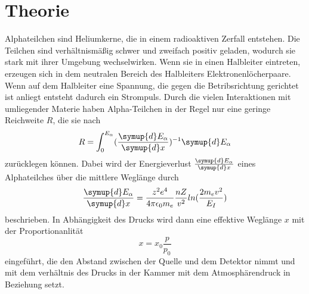 \section{Theorie}
\label{sec:Theorie}

Alphateilchen sind Heliumkerne, die in einem radioaktiven Zerfall entstehen. Die Teilchen sind verhältnismäßig
schwer und zweifach positiv geladen, wodurch sie stark mit ihrer Umgebung wechselwirken. Wenn sie in einen
Halbleiter eintreten, erzeugen sich in dem neutralen Bereich des Halbleiters Elektronenlöcherpaare. Wenn auf dem Halbleiter eine Spannung, die gegen die Betribsrichtung gerichtet ist anliegt
entsteht dadurch ein Strompuls. Durch die vielen Interaktionen mit umliegender Materie haben Alpha-Teilchen in der Regel
nur eine geringe Reichweite $R$, die sie nach
\begin{equation}
    R=\int_0^{E_\alpha}(\frac{\symup{d}E_\alpha}{\symup{d}x})^{-1}\symup{d}E_\alpha  
    \label{eqn:Weglänge}
\end{equation}
\noindent zurücklegen können. Dabei wird der Energieverlust $\frac{\symup{d}E_\alpha}{\symup{d}x}$ eines Alphateilches
über die mittlere Weglänge durch
\begin{equation}
    \frac{\symup{d}E_\alpha}{\symup{d}x}=\frac{z^2 e^4}{4\pi \epsilon_0 m_e}\frac{nZ}{v^2}ln(\frac{2m_ev^2}{E_I})
    \label{eqn:bethe}
\end{equation}
\noindent beschrieben.
In Abhängigkeit des Drucks wird dann eine effektive Weglänge $x$ mit der Proportionanlität
\begin{equation}
    x=x_0\frac{p}{p_0}
    \label{eqn:druck}
\end{equation}
eingeführt, die den Abstand zwischen der Quelle und dem Detektor nimmt und mit dem verhältnis des Drucks in der Kammer
mit dem Atmosphärendruck in Beziehung setzt.
\cite{sample}
